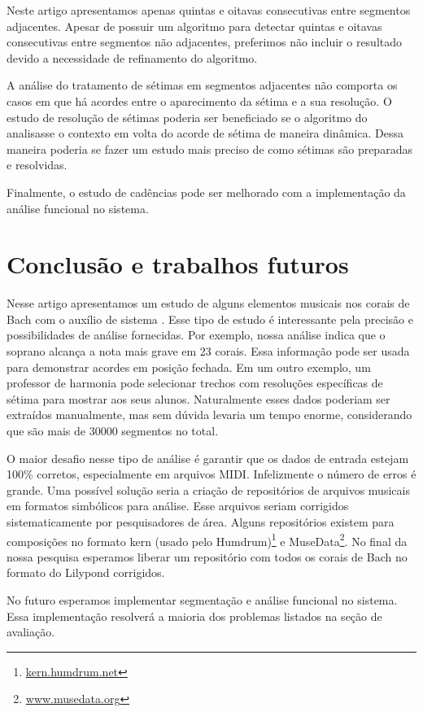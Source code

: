 Neste artigo apresentamos apenas quintas e oitavas consecutivas entre
segmentos adjacentes. Apesar de \rameau{} possuir um algoritmo para
detectar quintas e oitavas consecutivas entre segmentos não
adjacentes, preferimos não incluir o resultado devido a necessidade de
refinamento do algoritmo.

A análise do tratamento de sétimas em segmentos adjacentes não
comporta os casos em que há acordes entre o aparecimento da sétima e a
sua resolução. O estudo de resolução de sétimas poderia ser
beneficiado se o algoritmo do \rameau{} analisasse o contexto em volta
do acorde de sétima de maneira dinâmica. Dessa maneira poderia se
fazer um estudo mais preciso de como sétimas são preparadas e
resolvidas.

Finalmente, o estudo de cadências pode ser melhorado com a
implementação da análise funcional no sistema.

\section{Conclusão e trabalhos futuros}
\label{sec:concl-e-trab}

Nesse artigo apresentamos um estudo de alguns elementos musicais nos
corais de Bach com o auxílio de sistema \rameau{}. Esse tipo de estudo
é interessante pela precisão e possibilidades de análise fornecidas.
Por exemplo, nossa análise indica que o soprano alcança a nota mais
grave em 23 corais. Essa informação pode ser usada para demonstrar
acordes em posição fechada. Em um outro exemplo, um professor de
harmonia pode selecionar trechos com resoluções específicas de sétima
para mostrar aos seus alunos. Naturalmente esses dados poderiam ser
extraídos manualmente, mas sem dúvida levaria um tempo enorme,
considerando que são mais de 30000 segmentos no total.

O maior desafio nesse tipo de análise é garantir que os dados de
entrada estejam 100\% corretos, especialmente em arquivos MIDI.
Infelizmente o número de erros é grande. Uma possível solução seria a
criação de repositórios de arquivos musicais em formatos simbólicos
para análise. Esse arquivos seriam corrigidos sistematicamente por
pesquisadores de área. Alguns repositórios existem para composições no
formato kern (usado pelo Humdrum)\footnote{\url{kern.humdrum.net}} e
MuseData\footnote{\url{www.musedata.org}}. No final da nossa pesquisa
esperamos liberar um repositório com todos os corais de Bach no
formato do Lilypond corrigidos.

No futuro esperamos implementar segmentação e análise funcional no
sistema. Essa implementação resolverá a maioria dos problemas listados
na seção de avaliação.

